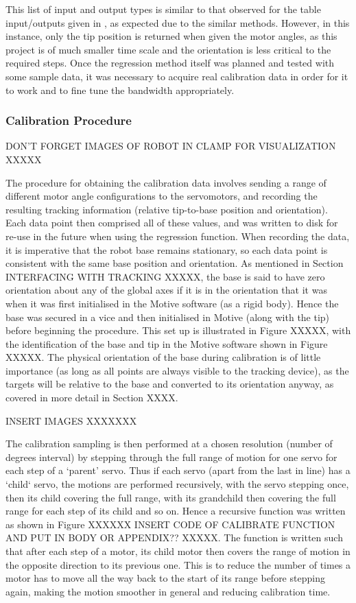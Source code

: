 \documentclass[11pt]{article}
\begin{document}
This list of input and output types is similar to that observed for the table input/outputs given in \cite{GreggSmithDesign}, as expected due to the similar methods. However, in this instance, only the tip position is returned when given the motor angles, as this project is of much smaller time scale and the orientation is less critical to the required steps. Once the regression method itself was planned and tested with some sample data, it was necessary to acquire real calibration data in order for it to work and to fine tune the bandwidth appropriately.


\subsubsection{Calibration Procedure}
DON'T FORGET IMAGES OF ROBOT IN CLAMP FOR VISUALIZATION XXXXX

The procedure for obtaining the calibration data involves sending a range of different motor angle configurations to the servomotors, and recording the resulting tracking information (relative tip-to-base position and orientation). Each data point then comprised all of these values, and was written to disk for re-use in the future when using the regression function. When recording the data, it is imperative that the robot base remains stationary, so each data point is consistent with the same base position and orientation. As mentioned in Section INTERFACING WITH TRACKING XXXXX, the base is said to have zero orientation about any of the global axes if it is in the orientation that it was when it was first initialised in the Motive software (as a rigid body). Hence the base was secured in a vice and then initialised in Motive (along with the tip) before beginning the procedure. This set up is illustrated in Figure XXXXX, with the identification of the base and tip in the Motive software shown in Figure XXXXX. The physical orientation of the base during calibration is of little importance (as long as all points are always visible to the tracking device), as the targets will be relative to the base and converted to its orientation anyway, as covered in more detail in Section XXXX.

INSERT IMAGES XXXXXXX


The calibration sampling is then performed at a chosen resolution (number of degrees interval) by stepping through the full range of motion for one servo for each step of a `parent' servo. Thus if each servo (apart from the last in line) has a `child` servo, the motions are performed recursively, with the servo stepping once, then its child covering the full range, with its grandchild then covering the full range for each step of its child and so on. Hence a recursive function was written as shown in Figure XXXXXX INSERT CODE OF CALIBRATE FUNCTION AND PUT IN BODY OR APPENDIX?? XXXXX. The function is written such that after each step of a motor, its child motor then covers the range of motion in the opposite direction to its previous one. This is to reduce the number of times a motor has to move all the way back to the start of its range before stepping again, making the motion smoother in general and reducing calibration time. 
\end{document}
